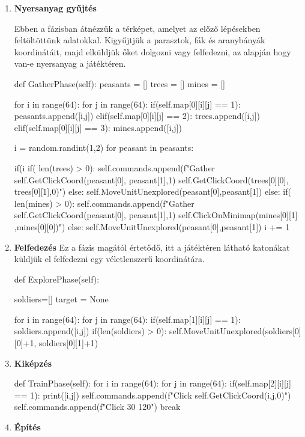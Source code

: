 \begin{enumerate}
    \item \textbf{Nyersanyag gyűjtés}

    Ebben a fázisban átnézzük a térképet, amelyet az előző lépésekben feltöltöttünk adatokkal. Kigyűjtjük a parasztok, fák és aranybányák koordinátáit, majd elküldjük őket dolgozni vagy felfedezni, az alapján hogy van-e nyersanyag a játéktéren.

    \begin{python}
        
def GatherPhase(self):
    peasants = []
    trees = []
    mines = []

    for i in range(64):
        for j in range(64):
            if(self.map[0][i][j] == 1):
                peasants.append([i,j])
            elif(self.map[0][i][j] == 2):
                trees.append([i,j])
            elif(self.map[0][i][j] == 3):
                mines.append([i,j])

    i = random.randint(1,2)
    for peasant in peasants:
            
        if(i %
            if( len(trees) > 0):
                self.commands.append(f"Gather 
                {self.GetClickCoord(peasant[0],
                peasant[1],1)} { self.GetClickCoord(trees[0][0],
                trees[0][1],0)}")
            else:
                self.MoveUnitUnexplored(peasant[0],peasant[1])
        else:
            if( len(mines) > 0):
                self.commands.append(f"Gather 
                {self.GetClickCoord(peasant[0],
                peasant[1],1)} { self.ClickOnMinimap(mines[0][1]
                ,mines[0][0])}")
            else:
                self.MoveUnitUnexplored(peasant[0],peasant[1])
        i += 1
\end{python}

\item \textbf{Felfedezés}
Ez a fázis magától értetődő, itt a játéktéren látható katonákat küldjük el felfedezni egy véletlenszerű koordinátára.
 \begin{python}
def ExplorePhase(self):

    soldiers=[]
    target = None
        
    for i in range(64):
        for j in range(64):
            if(self.map[1][i][j] == 1):
                soldiers.append([i,j])
    if(len(soldiers) > 0):
        self.MoveUnitUnexplored(soldiers[0][0]+1,
        soldiers[0][1]+1)
    \end{python}

    \item \textbf{Kiképzés}
    
    \begin{python}
def TrainPhase(self):
    for i in range(64):
        for j in range(64):
            if(self.map[2][i][j] == 1):
                print([i,j])
                self.commands.append(f"Click 
                        {self.GetClickCoord(i,j,0)}")
                self.commands.append(f"Click 30 120")
                break
    \end{python}

    \item \textbf{Építés}
    
\end{enumerate}

